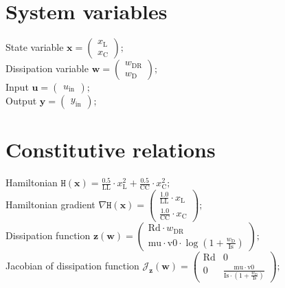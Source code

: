 \documentclass[11pt, oneside]{article}      %
\begin{document}
\section{System variables}
%
State variable $ \mathbf{x} = \left(\begin{array}{c}x_{\mathrm{L}}\\x_{\mathrm{C}}\end{array}\right) ; $ 
%
\\
%
Dissipation variable $ \mathbf{w} = \left(\begin{array}{c}w_{\mathrm{DR}}\\w_{\mathrm{D}}\end{array}\right) ; $ 
%
\\
%
Input $ \mathbf{u} = \left(\begin{array}{c}u_{\mathrm{in}}\end{array}\right) ; $ 
%
\\
%
Output $ \mathbf{y} = \left(\begin{array}{c}y_{\mathrm{in}}\end{array}\right) ; $ 
%
\\
%
%
\section{Constitutive relations}
%
Hamiltonian $ \mathtt{H}(\mathbf{x}) = \frac{0.5}{\mathrm{LL}} \cdot x_{\mathrm{L}}^{2} + \frac{0.5}{\mathrm{CC}} \cdot x_{\mathrm{C}}^{2} ; $ 
%
\\
%
Hamiltonian gradient $ \nabla \mathtt{H}(\mathbf{x}) = \left(\begin{array}{c}\frac{1.0}{\mathrm{LL}} \cdot x_{\mathrm{L}}\\\frac{1.0}{\mathrm{CC}} \cdot x_{\mathrm{C}}\end{array}\right) ; $ 
%
\\
%
Dissipation function $ \mathbf{z}(\mathbf{w}) = \left(\begin{array}{c}\mathrm{Rd} \cdot w_{\mathrm{DR}}\\\mathrm{mu} \cdot \mathrm{v0} \cdot \log{\left (1 + \frac{w_{\mathrm{D}}}{\mathrm{Is}} \right )}\end{array}\right) ; $ 
%
\\
%
Jacobian of dissipation function $ \mathcal{J}_{\mathbf{z}}(\mathbf{w}) = \left(\begin{array}{cc}\mathrm{Rd} & 0\\0 & \frac{\mathrm{mu} \cdot \mathrm{v0}}{\mathrm{Is} \cdot \left(1 + \frac{w_{\mathrm{D}}}{\mathrm{Is}}\right)}\end{array}\right) ; $ 
%
\\
%
%
\end{document}
